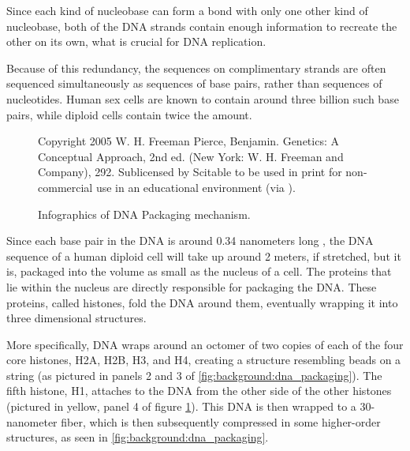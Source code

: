 \documentclass[parskip]{cs4rep}
\begin{document}
Since each kind of nucleobase can form a bond with only one other kind of
nucleobase, both of the DNA strands contain enough information to recreate the
other on its own, what is crucial for DNA replication. 

Because of this redundancy, the sequences on complimentary strands are often sequenced simultaneously as sequences of base pairs, rather than sequences of nucleotides. Human sex cells are known to contain around three billion such base pairs, while diploid cells contain twice the amount\cite{Annunziato:2008wh}.

\begin{figure}[p]
   \centering
   {Copyright 2005 W. H. Freeman Pierce, Benjamin. Genetics: A Conceptual Approach, 2nd ed. (New York: W. H. Freeman and Company), 292. Sublicensed by Scitable to be used in print for non-commercial use in an educational environment (via \cite{Annunziato:2008wh}).}
   
   \caption{Infographics of DNA Packaging mechanism. }
   \label{fig:background:dna_packaging} 
\end{figure}

Since each base pair in the DNA is around 0.34 nanometers long \cite{Annunziato:2008wh},
the DNA sequence of a human diploid cell will take up around 2 meters, if stretched, but it is, packaged into the volume as small as the nucleus of a cell. The proteins that lie within the nucleus are directly responsible for packaging the DNA. These proteins, called histones, fold the DNA around them, eventually wrapping it into three dimensional structures.

More specifically, DNA wraps around an octomer of two copies of each of the four core histones, H2A, H2B, H3, and H4, creating a structure resembling beads on a string (as pictured in panels 2 and 3 of \autoref{fig:background:dna_packaging}). The fifth histone, H1, attaches to the DNA from the other side of the other histones (pictured in yellow, panel 4 of figure \ref{fig:background:dna_packaging}). This DNA is then wrapped to a 30-nanometer fiber, which is then subsequently compressed in some higher-order structures, as seen in \autoref{fig:background:dna_packaging}.
\end{document}
